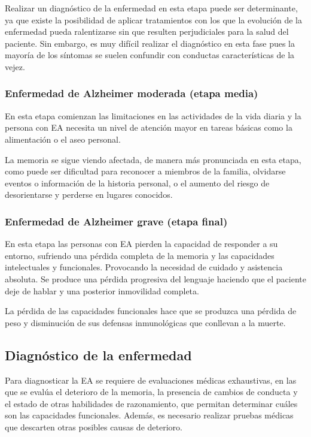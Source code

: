 Realizar un diagnóstico de la enfermedad en esta etapa puede ser determinante, ya que existe la posibilidad de aplicar
tratamientos con los que la evolución de la enfermedad pueda ralentizarse sin que resulten perjudiciales para la salud
del paciente.
Sin embargo, es muy difícil realizar el diagnóstico en esta fase pues la mayoría de los síntomas se suelen confundir con
conductas características de la vejez.

\subsubsection{Enfermedad de Alzheimer moderada (etapa media)}\label{subsubsec:etapa-media-EA}
En esta etapa comienzan las limitaciones en las actividades de la vida diaria y la persona con EA necesita un nivel de
atención mayor en tareas básicas como la alimentación o el aseo personal.

La memoria se sigue viendo afectada, de manera más pronunciada en esta etapa, como puede ser dificultad para reconocer a
miembros de la familia, olvidarse eventos o información de la historia personal, o el aumento del riesgo de
desorientarse y perderse en lugares conocidos.

\subsubsection{Enfermedad de Alzheimer grave (etapa final)}\label{subsubsec:etapa-final-EA}
En esta etapa las personas con EA pierden la capacidad de responder a su entorno, sufriendo una pérdida completa de la
memoria y las capacidades intelectuales y funcionales.
Provocando la necesidad de cuidado y asistencia absoluta.
Se produce una pérdida progresiva del lenguaje haciendo que el paciente deje de hablar y una posterior inmovilidad
completa.

La pérdida de las capacidades funcionales hace que se produzca una pérdida de peso y disminución de sus defensas
inmunológicas que conllevan a la muerte.

\subsection{Diagnóstico de la enfermedad}\label{subsec:diagnostico-enfermedad}
Para diagnosticar la EA se requiere de evaluaciones médicas exhaustivas, en las que se evalúa el deterioro de la memoria,
la presencia de cambios de conducta y el estado de otras habilidades de razonamiento, que permitan determinar cuáles son
las capacidades funcionales.
Además, es necesario realizar pruebas médicas que descarten otras posibles causas de deterioro.

